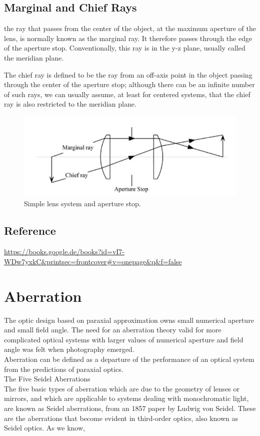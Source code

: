 \documentclass[../main.tex]{subfiles}
\begin{document}
	\subsection{Marginal and Chief Rays}
	the ray that passes from the center of the object, at the maximum aperture of the lens, is normally known as the marginal ray. It therefore passes through the edge of the aperture stop. Conventionally, this ray is in the y-z plane, usually called the meridian plane.

	The chief ray is defined to be the ray from an off-axis point in the object passing through the center of the aperture stop; although there can be an infinite number of such rays, we can usually assume, at least for centered systems, that the chief ray is also restricted to the meridian plane.
	\begin{figure}[h!]
		\centering
		\includegraphics[scale=0.8]{../graphics/Geometrical_optics13.png}
		\caption{Simple lens system and aperture stop.}
		\label{fig:ray}
	\end{figure}
	\subsection{Reference}
	\url{https://books.google.de/books?id=vI7-WDw7yxkC&printsec=frontcover#v=onepage&q&f=false}

	\section{Aberration}
	The optic design based on paraxial approximation owns small numerical aperture and small field angle. The need for an aberration theory valid for more complicated optical systems with larger values of numerical aperture and field angle was felt when photography emerged.\\
	Aberration can be defined as a departure of the performance of an optical system from the predictions of paraxial optics.\\
	The Five Seidel Aberrations\\
	The five basic types of aberration which are due to the geometry of lenses or mirrors, and which are applicable to systems dealing with monochromatic light, are known as Seidel aberrations, from an 1857 paper by Ludwig von Seidel. These are the aberrations that become evident in third-order optics, also known as Seidel optics.
	As we know,
\end{document}
